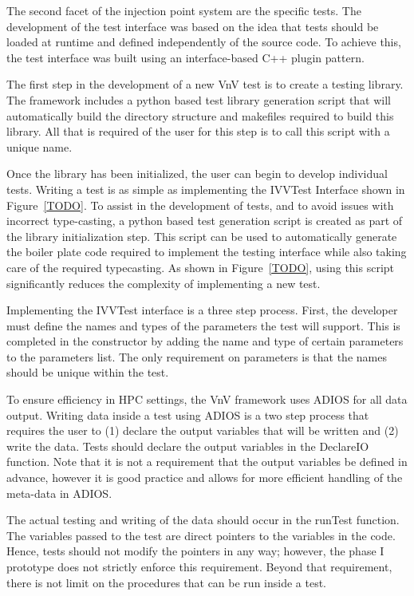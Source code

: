 The second facet of the injection point system are the specific \VV tests. The development of the 
test interface was based on the idea that tests should be loaded at runtime and defined independently of the source code. To achieve this, the test
interface was built using an interface-based C++ plugin pattern.

The first step in the development of a new VnV test is to create a testing library. The framework includes a python
based test library generation script that will automatically build the directory structure and makefiles required to 
build this library. All that is required of the user for this step is to call this script with a unique name. 

Once the library has been initialized, the user can begin to develop individual tests. Writing a test is as simple as implementing the IVVTest Interface shown in Figure~\ref{TODO}. To assist in the development of tests, and to avoid issues with incorrect type-casting, a python based test generation script is created as part of the library initialization step. This script can be used to automatically generate the boiler plate code required to implement the testing interface while also taking care of the required typecasting. As shown in Figure~\ref{TODO}, using this script significantly reduces the complexity of implementing a new test. 

Implementing the IVVTest interface is a three step process. First, the developer must define the names and types of the parameters the test will support. This is completed in the constructor by adding the name and type of certain parameters to the parameters list. The only requirement on parameters is that the names should be unique within the test. 

To ensure efficiency in HPC settings, the VnV framework uses ADIOS for all data output. Writing data inside a test using ADIOS is a two step process that requires the user to (1) declare the output variables that will be written and (2) write the data. Tests should declare the output variables in the DeclareIO function. Note that it is not a requirement that the output variables be defined in advance, however it is good practice and allows for more efficient handling of the meta-data in ADIOS. 

The actual testing and writing of the data should occur in the runTest function. The variables passed to the test are direct pointers to the variables in the code. Hence, tests should not modify the pointers in any way; however, the phase I prototype does not strictly enforce this requirement. Beyond that requirement, there is not limit on the procedures that can be run inside a test. 

